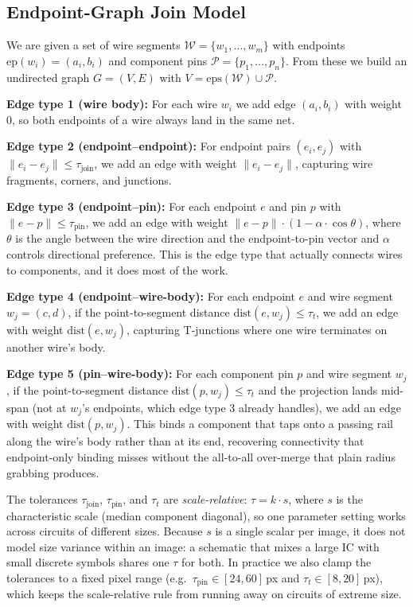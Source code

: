 \documentclass[journal]{IEEEtran}
\begin{document}
\subsection{Endpoint-Graph Join Model}

We are given a set of wire segments $\mathcal{W} = \{w_1, \ldots, w_m\}$ with endpoints $\text{ep}(w_i) = (a_i, b_i)$ and component pins $\mathcal{P} = \{p_1, \ldots, p_n\}$. From these we build an undirected graph $G = (V, E)$ with $V = \text{eps}(\mathcal{W}) \cup \mathcal{P}$.

\textbf{Edge type 1 (wire body):} For each wire $w_i$ we add edge $(a_i, b_i)$ with weight 0, so both endpoints of a wire always land in the same net.

\textbf{Edge type 2 (endpoint--endpoint):} For endpoint pairs $(e_i, e_j)$ with $\|e_i - e_j\| \leq \tau_{\text{join}}$, we add an edge with weight $\|e_i - e_j\|$, capturing wire fragments, corners, and junctions.

\textbf{Edge type 3 (endpoint--pin):} For each endpoint $e$ and pin $p$ with $\|e - p\| \leq \tau_{\text{pin}}$, we add an edge with weight $\|e - p\| \cdot (1 - \alpha \cdot \cos\theta)$, where $\theta$ is the angle between the wire direction and the endpoint-to-pin vector and $\alpha$ controls directional preference. This is the edge type that actually connects wires to components, and it does most of the work.

\textbf{Edge type 4 (endpoint--wire-body):} For each endpoint $e$ and wire segment $w_j = (c, d)$, if the point-to-segment distance $\text{dist}(e, w_j) \leq \tau_t$, we add an edge with weight $\text{dist}(e, w_j)$, capturing T-junctions where one wire terminates on another wire's body.

\textbf{Edge type 5 (pin--wire-body):} For each component pin $p$ and wire segment $w_j$, if the point-to-segment distance $\text{dist}(p, w_j) \leq \tau_t$ and the projection lands mid-span (not at $w_j$'s endpoints, which edge type 3 already handles), we add an edge with weight $\text{dist}(p, w_j)$. This binds a component that taps onto a passing rail along the wire's body rather than at its end, recovering connectivity that endpoint-only binding misses without the all-to-all over-merge that plain radius grabbing produces.

The tolerances $\tau_{\text{join}}$, $\tau_{\text{pin}}$, and $\tau_t$ are \emph{scale-relative}: $\tau = k \cdot s$, where $s$ is the characteristic scale (median component diagonal), so one parameter setting works across circuits of different sizes. Because $s$ is a single scalar per image, it does not model size variance within an image: a schematic that mixes a large IC with small discrete symbols shares one $\tau$ for both. In practice we also clamp the tolerances to a fixed pixel range (e.g.\ $\tau_{\text{pin}} \in [24, 60]\,$px and $\tau_t \in [8, 20]\,$px), which keeps the scale-relative rule from running away on circuits of extreme size.
\end{document}
